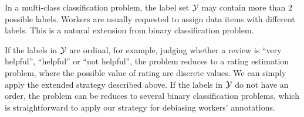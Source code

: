 In a multi-class classification problem, 
the label set ${\mathcal{Y}}$ may contain more than $2$ possible labels.  
Workers are usually requested to assign data items with different labels.  
This is a natural extension from binary classification problem.  

If the labels in ${\mathcal{Y}}$ are ordinal, 
for example, judging whether a review is ``very helpful'', ``helpful'' or ``not helpful'', 
the problem reduces to a rating estimation problem, 
where the possible value of rating are discrete values.  
We can simply apply the extended strategy described above.  
If the labels in ${\mathcal{Y}}$ do not have an order, 
the problem can be reduces to several binary classification problems, 
which is straightforward to apply our strategy for debiasing workers' annotations.  






